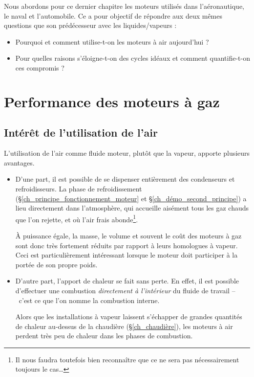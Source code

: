 
	Nous abordons pour ce dernier chapitre les moteurs utilisés dans l’aéronautique, le naval et l’automobile. Ce \coursdix a pour objectif de répondre aux deux mêmes questions que son prédécesseur avec les liquides/vapeurs :
	\begin{itemize}
		\item Pourquoi et comment utilise-t-on les moteurs à air aujourd’hui ?
		\item Pour quelles raisons s’éloigne-t-on des cycles idéaux et comment quantifie-t-on ces compromis ?
	\end{itemize}\dontbreakpage \vspace{2em}


\section{Performance des moteurs à gaz}



	\subsection{Intérêt de l’utilisation de l’air}

		L’utilisation de l’air comme fluide moteur, plutôt que la vapeur, apporte plusieurs avantages.

		\begin{itemize}
			\item D’une part, il est possible de se dispenser entièrement des condenseurs et refroidisseurs. La phase de refroidissement (\S\ref{ch_principe_fonctionnement_moteur} et \S\ref{ch_démo_second_principe}) a lieu directement dans l’atmosphère, qui accueille aisément tous les gaz chauds que l’on rejette, et où l’air frais abonde\footnote{Il nous faudra toutefois bien reconnaître que ce ne sera pas nécessairement toujours le cas…}.

			À puissance égale, la masse, le volume et souvent le coût des moteurs à gaz sont donc très fortement réduits par rapport à leurs homologues à vapeur. Ceci est particulièrement intéressant lorsque le moteur doit participer à la portée de son propre poids.

			\item D’autre part, l’apport de chaleur se fait sans perte. En effet, il est possible d’ef\-fec\-tuer une combustion \emph{directement à l’intérieur} du fluide de travail --\ c’est ce que l’on nomme la combustion interne. 

			Alors que les installations à vapeur laissent s’échapper de grandes quantités de chaleur au-dessus de la chaudière (\S\ref{ch_chaudière}), les moteurs à air perdent très peu de chaleur dans les phases de combustion.

		\end{itemize}

